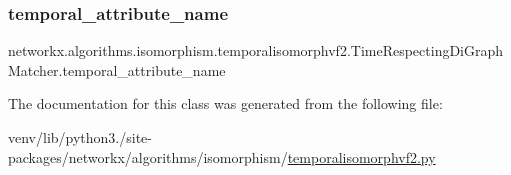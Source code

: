 \subsubsection{\texorpdfstring{temporal\+\_\+attribute\+\_\+name}{temporal\_attribute\_name}}
{\footnotesize\ttfamily networkx.\+algorithms.\+isomorphism.\+temporalisomorphvf2.\+Time\+Respecting\+Di\+Graph\+Matcher.\+temporal\+\_\+attribute\+\_\+name}



The documentation for this class was generated from the following file\+:\begin{DoxyCompactItemize}
\item 
venv/lib/python3./site-\/packages/networkx/algorithms/isomorphism/\hyperlink{temporalisomorphvf2_8py}{temporalisomorphvf2.\+py}\end{DoxyCompactItemize}
